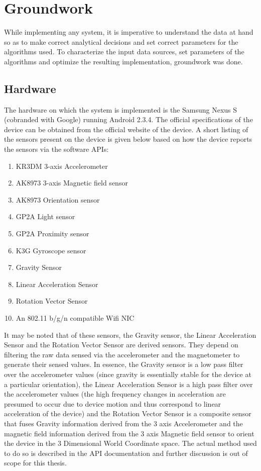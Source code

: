 \chapter{Groundwork\label{chap:groundwork}}


While implementing any system, it is imperative to understand the data at hand
so as to make correct analytical decisions and set correct parameters for the
algorithms used. To characterize the input data sources, set parameters of the
algorithms and optimize the resulting implementation, groundwork was done.

\section{Hardware}
The hardware on which the system is implemented is the Samsung Nexus S (cobranded with
Google) running Android 2.3.4. The official specifications of the device can be
obtained from the official website of the device\cite{NexusSpecs}. A
short listing of the sensors present on the device is given below based on how
the device reports the sensors via the software APIs:

\begin{enumerate}
\item KR3DM 3-axis Accelerometer
\item AK8973 3-axis Magnetic field sensor
\item AK8973 Orientation sensor
\item GP2A Light sensor
\item GP2A Proximity sensor
\item K3G Gyroscope sensor
\item Gravity Sensor
\item Linear Acceleration Sensor
\item Rotation Vector Sensor
\item An 802.11 b/g/n compatible Wifi NIC
\end{enumerate}

It may be noted that of these sensors, the Gravity sensor, the Linear
Acceleration Sensor and the Rotation Vector Sensor are derived sensors. They
depend on filtering the raw data sensed via the accelerometer and the
magnetometer to generate their sensed values. In essence, the Gravity sensor is
a low pass filter over the accelerometer values (since gravity is essentially
stable for the device at a particular orientation), the Linear Acceleration
Sensor is a high pass filter over the accelerometer values (the high frequency
changes in acceleration are presumed to occur due to device motion and thus
correspond to linear acceleration of the device) and the Rotation Vector Sensor
is a composite sensor that fuses Gravity information derived from the
3 axis Accelerometer and the magnetic field information derived from the
3 axis Magnetic field sensor to orient the device in the 3 Dimensional World 
Coordinate space. The actual method used to do so is described in the API
documentation \cite{AndroidSensorManager} and
further discussion is out of scope for this thesis.

